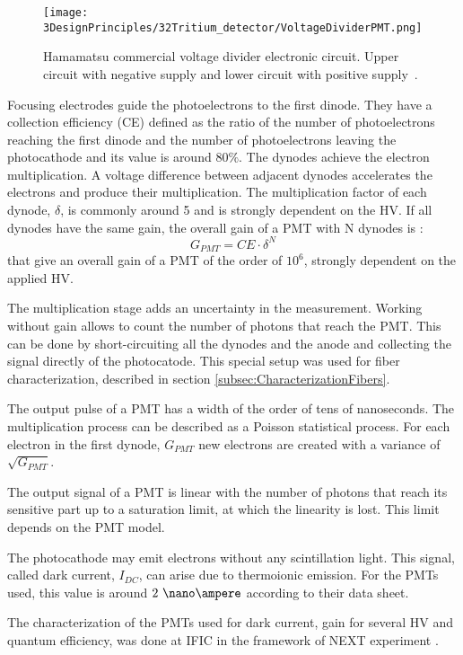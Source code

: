 \begin{enumerate}
\begin{figure}[h]
\centering
\texttt{[image: 3DesignPrinciples/32Tritium\_detector/VoltageDividerPMT.png]}
\caption{Hamamatsu commercial voltage divider electronic circuit. Upper circuit with negative supply and lower circuit with positive supply\label{fig:VoltageDividerCircuit}~\cite{DataSheetPMTs}.}
\end{figure}


Focusing electrodes guide the photoelectrons to the first dinode. They have a collection efficiency (CE) defined as the ratio of the number of photoelectrons reaching the first dinode and the number of photoelectrons leaving the photocathode and its value is around $80\%$. The dynodes achieve the electron multiplication. A voltage difference between adjacent dynodes accelerates the electrons and produce their multiplication. The multiplication factor of each dynode, $\delta$, is commonly around 5 and is strongly dependent on the HV. If all dynodes have the same gain, the overall gain of a PMT with N dynodes is \cite{Knoll}:
\begin{equation}
G_{PMT} = CE\cdot{} \delta^N
\label{eq:PMTGain}
\end{equation}
that give an overall gain of a PMT of the order of $10^6$, strongly dependent on the applied HV.

The multiplication stage adds an uncertainty in the measurement. Working without gain allows to count the number of photons that reach the PMT. This can be done by short-circuiting all the dynodes and the anode and collecting the signal directly of the photocatode. This special setup was used for fiber characterization, described in section \ref{subsec:CharacterizationFibers}.

\end{enumerate}

The output pulse of a PMT has a width of the order of tens of nanoseconds. The multiplication process can be described as a Poisson statistical process. For each electron in the first dynode, $G_{PMT}$ new electrons are created with a variance of $\sqrt{G_{PMT}}$.

The output signal of a PMT is linear with the number of photons that reach its sensitive part up to a saturation limit, at which the linearity is lost. This limit depends on the PMT model.

The photocathode may emit electrons without any scintillation light. This signal, called dark current, $I_{DC}$, can  arise due to thermoionic emission. For the PMTs used, this value is around $2~\nano\ampere$ according to their data sheet.

The characterization of the PMTs used for dark current, gain for several HV and quantum efficiency,  was done at IFIC in the framework of NEXT experiment \cite{CalibrationPMTsNEXT}. 